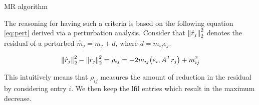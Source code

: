 \documentclass[paper=A4, fontsize=11pt]{scrartcl}
\let\originalleft\left
\let\originalright\right
\renewcommand{\left}{\mathopen{}\mathclose\bgroup\originalleft}
\renewcommand{\right}{\aftergroup\egroup\originalright}
\theoremstyle{remark}
\begin{document}
\begin{section}{MR algorithm}

The reasoning for having such a criteria is based on the following equation \eqref{eq:pert} derived via a perturbation analysis.
Consider that $\left\|\hat{r}_{j}\right\|_{2}^{2}$ denotes the residual of a perturbed $\hat{m}_{j} = m_j + d$, where $d = m_{ij} e_j$.

\begin{equation}\label{eq:pert}
\left\|\hat{r}_{j}\right\|_{2}^{2}-\left\|r_{j}\right\|_{2}^{2}= \rho_{i j} = -2 m_{i j}\left(e_{i}, A^{T} r_{j}\right)+m_{i j}^{2}
\end{equation}

This intuitively means that $\rho_{i j}$ measures the amount of reduction in the residual by considering entry $i$. We then keep the $\text{lfil}$ entries which result in the maximum decrease.
	
	
\end{section}


\newpage
\end{document}
